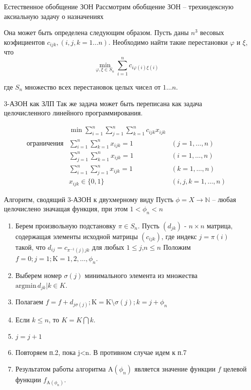\documentclass[12pt]{beamer}
\begin{document}
\begin{frame}{Естественное обобщение ЗОН}
Рассмотрим обобщение ЗОН -- трехиндексную аксиальную задачу о назначениях

Она может быть определена следующим образом. 
Пусть даны $n^3$ весовых коэфициентов $c_{ijk}, (i,j,k=1 \ldots n)$. 
Необходимо найти такие перестановки $\varphi$ и $\xi$, что 
\[
  \min_{\varphi, \xi \in S_n} \sum^n_{i = 1} c_{i \varphi (i) \xi(i)}
\]

где $S_n$ множество всех перестановок целых чисел от $1 \ldots n$.
\end{frame}

\begin{frame}{3-АЗОН как ЗЛП}
Так же задача может быть переписана как задача целочисленного линейного программирования. 

\begin{eqnarray*}
  & \min \displaystyle \sum^n_{i = 1} \displaystyle \sum^n_{j = 1} \displaystyle \sum^n_{k = 1}
  c_{ijk} x_{ijk} \\
  \text{ограничения}
  &\displaystyle \sum^n_{i = 1} \displaystyle \sum^n_{k = 1} x_{ijk} = 1  &(j = 1, \ldots, n) \\
  &\displaystyle \sum^n_{j = 1} \displaystyle \sum^n_{k = 1} x_{ijk} = 1  &(i = 1, \ldots, n) \\
  &\displaystyle \sum^n_{i = 1} \displaystyle \sum^n_{j = 1} x_{ijk} = 1  &(k = 1, \ldots, n) \\
  & x_{ijk} \in \{ 0, 1 \} &(i,j,k = 1, \ldots, n)
\end{eqnarray*}
\end{frame}

\begin{frame}{Алгоритм, сводящий 3-АЗОН к двухмерному виду}
Пусть $\phi = X \rightarrow \mathbb{N}$ -- любая целочислено значащая функция, при этом $1 < \phi_n < n$ 
\begin{enumerate}
\item Берем произвольную подстановку $\pi \in S_n$. Пусть $(d_{jk})$ - $n \times n$ 
матрица, содержащая элементы исходной матрицы $(c_{ijk})$, где индекс $j=\pi(i)$ такой, что
$
d_{ij} = c_{\pi^{-1}(j)jk}
$
для любых $1 \leq j$,$n \leq n$
Положим $f = 0 ; j =1 ; \mathrm{K}={1,2, \ldots , \phi_n}$. 
\item Выберем номер $\sigma(j)$ минимального элемента из множества $\mathrm{argmin} \, {d_{jk} | k \in K}$.
\item Полагаем $f = f + d_{j \sigma (j)} ; \mathrm{K} = \mathrm{K}  \setminus  {\sigma(j)} ; k=j+\phi_n$
\item Если $k \leq n $, то $K = K \bigcap {k}$.
\item $j = j + 1$
\item Повторяем п.2, пока j<n. В противном случае идем к п.7
\item Результатом работы алгоритма $\mathrm{A}(\phi_n)$ является значение функции $f$ целевой функции   
$f_{\mathrm{A}(\phi_n)}$. 
\end{enumerate}
\end{frame}
\end{document}
